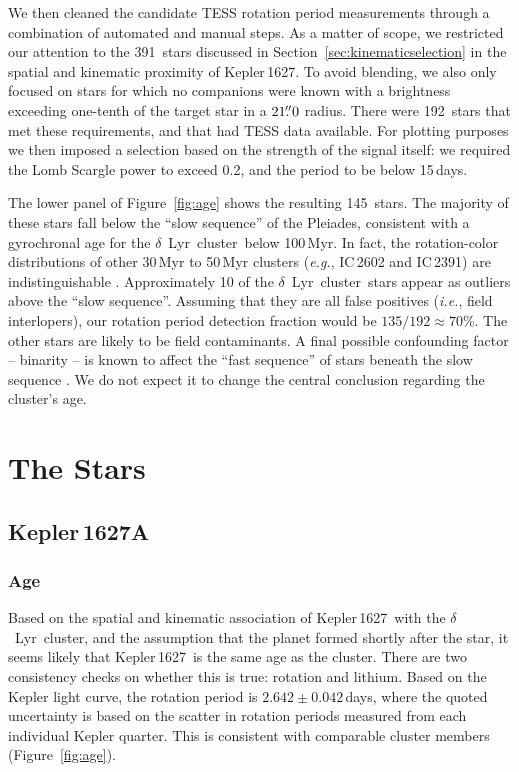 \documentclass[12pt,modern,twocolumn,tighten]{aastex63}
\newcommand{\cn}{$\delta$\ Lyr\ cluster} %
\newcommand{\sn}{Kepler\,1627} %
\newcommand{\nkinwithtess}{391} %
\newcommand{\nkinwithtessandcrowding}{192} %
\newcommand{\nkindefaultcleaning}{145} %
\newcommand{\nrotgood}{135} %
\newcommand{\nfracprot}{70} %
\begin{document}
We then cleaned the candidate TESS rotation period measurements
through a combination of automated and manual steps.  As a matter of
scope, we restricted our attention to the \nkinwithtess\ stars
discussed in Section~\ref{sec:kinematicselection} in the spatial and
kinematic proximity of Kepler\,1627.  To avoid blending, we also only
focused on stars for which no companions were known with a brightness
exceeding one-tenth of the target star in a $21\mbox{$.\!\!^{\prime\prime}$}0$ radius.  There
were \nkinwithtessandcrowding\ stars that met these requirements, and
that had TESS data available.  For plotting purposes we then imposed a
selection based on the strength of the signal itself: we required the
Lomb Scargle power to exceed 0.2, and the period to be below 15\,days.

The lower panel of Figure~\ref{fig:age} shows the resulting
\nkindefaultcleaning\ stars.  The majority of these stars fall below
the ``slow sequence'' of the Pleiades, consistent with a gyrochronal
age for the \cn\ below 100\,Myr.  In fact, the rotation-color
distributions of other 30\,Myr to 50\,Myr clusters ({\it e.g.},
IC\,2602 and IC\,2391) are indistinguishable
\citep{douglas_stephanie_t_2021_5131306}.  Approximately 10 of the
\cn\ stars appear as outliers above the ``slow sequence''.  Assuming
that they are all false positives ({\it i.e.}, field interlopers), our
rotation period detection fraction would be
$\nrotgood/\nkinwithtessandcrowding \approx \nfracprot\%$.   The other
stars are likely to be field contaminants.  A final possible
confounding factor -- binarity -- is known to affect the ``fast
sequence'' of stars beneath the slow sequence
\citep{meibom_effect_2007,gillen_ngts_2020,bouma_2021_ngc2516}.  We do
not expect it to change the central conclusion regarding the cluster's
age.


\section{The Stars}
\label{sec:stars}

\subsection{Kepler\,1627A}
\subsubsection{Age}
Based on the spatial and kinematic association of \sn\ with the \cn,
and the assumption that the planet formed shortly after the star, it
seems likely that \sn\ is the same age as the cluster. There are two
consistency checks on whether this is true: rotation and lithium.
Based on the Kepler light curve, the rotation period is
$2.642\pm0.042$\,days, where the quoted uncertainty is based on the
scatter in rotation periods measured from each individual Kepler
quarter.  This is consistent with comparable cluster members
(Figure~\ref{fig:age}).
\end{document}
